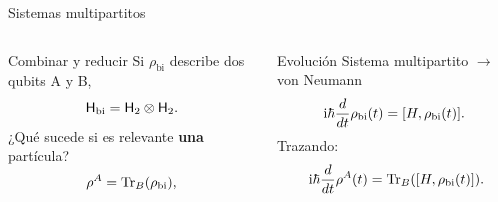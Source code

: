 \begin{frame}{Sistemas multipartitos}
    \begin{columns}
        \begin{column}{0.5\textwidth}
            \begin{block}{Combinar y reducir}
            Si $\rho_{\text{bi}}$ describe dos qubits A y B,
            \begin{equation}
                {\sf H}_{\text{bi}}={\sf H}_{2}\otimes{\sf H}_{2}.\nonumber
            \end{equation}
           \pause
           ¿Qué sucede si es relevante \textbf{una} partícula?\pause
            \begin{equation}
                \rho^{A}=\Tr_{B}(\rho_{\text{bi}}),\nonumber
            \end{equation}
            \end{block}
        \end{column}
        \pause
        \begin{column}{0.5\textwidth}
            \begin{block}{Evolución}
            Sistema multipartito $\rightarrow$ von Neumann
            \begin{equation}
                \text{i}\hbar\frac{d}{d t} \rho_{\text{bi}}(t)=[H,\rho_{\text{bi}}(t)].\nonumber
            \end{equation}\pause
            \vspace{0.3cm}
            Trazando:
            \begin{align}
                \rmi\hbar\frac{d}{d t} \rho^{A}(t)=\Tr_{B}([H,\rho_{\text{bi}}(t)])\rlap{.}\nonumber
            \end{align}
        \end{block}
        \end{column}
    \end{columns}
\end{frame}
